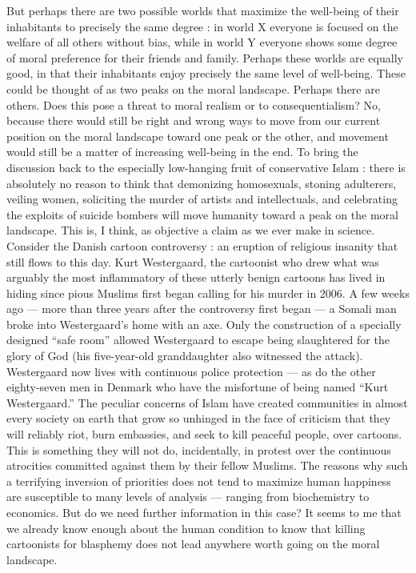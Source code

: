 \documentclass[a4paper,14pt]{extbook}
\begin{document}
But perhaps there are two possible worlds that maximize the well-being of their inhabitants to precisely the same degree :
in world X everyone is focused on the welfare of all others without bias, while in world Y everyone shows some degree of moral preference for their friends and family.
Perhaps these worlds are equally good, in that their inhabitants enjoy precisely the same level of well-being.
These could be thought of as two peaks on the moral landscape.
Perhaps there are others.
Does this pose a threat to moral realism or to consequentialism?
No, because there would still be right and wrong ways to move from our current position on the moral landscape toward one peak or the other, and movement would still be a matter of increasing well-being in the end.
To bring the discussion back to the especially low-hanging fruit of conservative Islam :
there is absolutely no reason to think that demonizing homosexuals, stoning adulterers, veiling women, soliciting the murder of artists and intellectuals, and celebrating the exploits of suicide bombers will move humanity toward a peak on the moral landscape.
This is, I think, as objective a claim as we ever make in science.
Consider the Danish cartoon controversy :
an eruption of religious insanity that still flows to this day.
Kurt Westergaard, the cartoonist who drew what was arguably the most inflammatory of these utterly benign cartoons has lived in hiding since pious Muslims first began calling for his murder in 2006.
A few weeks ago --- more than three years after the controversy first began --- a Somali man broke into Westergaard's home with an axe.
Only the construction of a specially designed ``safe room'' allowed Westergaard to escape being slaughtered for the glory of God (his five-year-old granddaughter also witnessed the attack).
Westergaard now lives with continuous police protection --- as do the other eighty-seven men in Denmark who have the misfortune of being named ``Kurt Westergaard.''
The peculiar concerns of Islam have created communities in almost every society on earth that grow so unhinged in the face of criticism that they will reliably riot, burn embassies, and seek to kill peaceful people, over cartoons.
This is something they will not do, incidentally, in protest over the continuous atrocities committed against them by their fellow Muslims.
The reasons why such a terrifying inversion of priorities does not tend to maximize human happiness are susceptible to many levels of analysis --- ranging from biochemistry to economics.
But do we need further information in this case?
It seems to me that we already know enough about the human condition to know that killing cartoonists for blasphemy does not lead anywhere worth going on the moral landscape.
\end{document}
